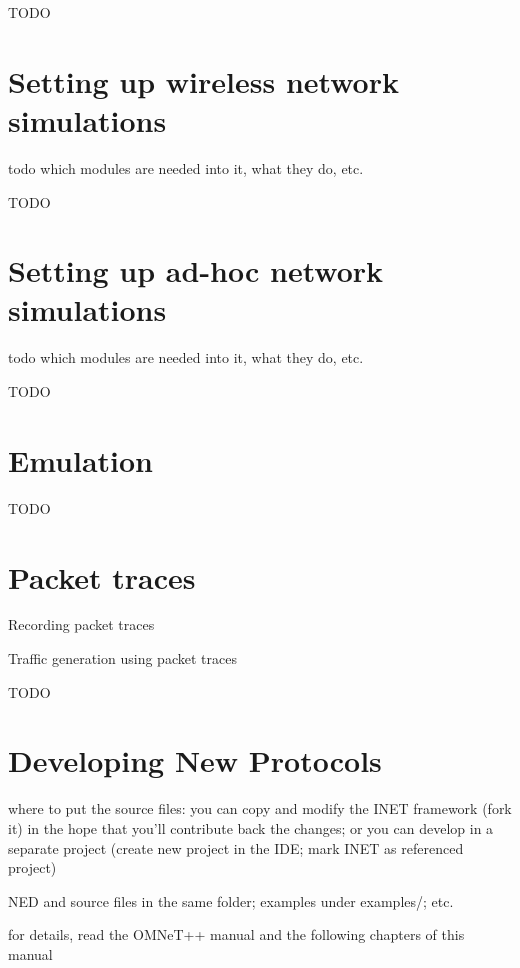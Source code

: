 \ifdraft TODO
\section{Setting up wireless network simulations}

todo which modules are needed into it, what they do, etc.
\fi

\ifdraft TODO
\section{Setting up ad-hoc network simulations}

todo which modules are needed into it, what they do, etc.
\fi

\ifdraft TODO
\section{Emulation}
\fi

\ifdraft TODO
\section{Packet traces}

Recording packet traces

Traffic generation using packet traces
\fi

\ifdraft TODO
\section{Developing New Protocols}

where to put the source files: you can copy and modify the INET framework (fork it)
in the hope that you'll contribute back the changes; or you can develop in
a separate project (create new project in the IDE; mark INET as referenced project)

NED and source files in the same folder; examples under examples/; etc.

for details, read the OMNeT++ manual and the following chapters of this manual

\fi




